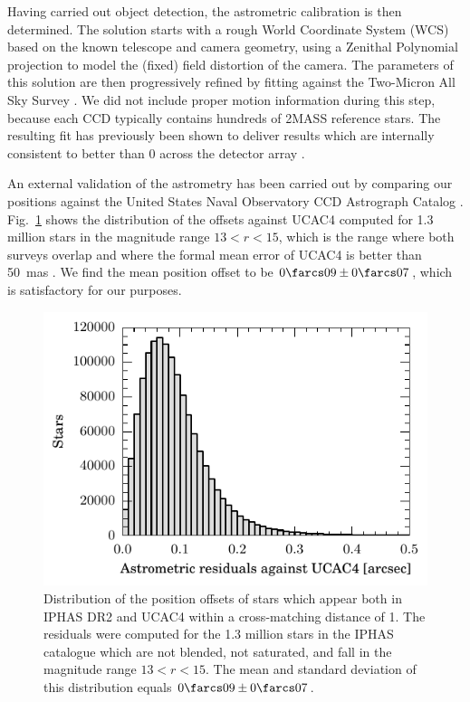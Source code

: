 \documentclass[a4paper,useAMS,usenatbib]{mn2e}
\begin{document}
{Having carried out object detection,
the astrometric calibration is then determined.
The solution starts with a rough 
World Coordinate System (WCS)
based on the known telescope and camera geometry,
using a Zenithal Polynomial projection
\citep[ZPN;][]{Calabretta2002}
to model the (fixed) field distortion of the camera.
The parameters of this solution
are then progressively refined by fitting against the
Two-Micron All Sky Survey \citep[2MASS; ][]{Skrutskie2006}.
We did not include proper motion information during this step,
because each CCD typically contains
hundreds of 2MASS reference stars.
The resulting fit has previously been shown
to deliver results which are internally consistent
to better than 0 across the detector array
\citep{Gonzalez-Solares2008}.

An external validation of the astrometry 
has been carried out by comparing our positions against the
United States Naval Observatory CCD Astrograph Catalog 
\citep[UCAC4;][]{UCAC4}.
Fig.~\ref{fig:astrometry} shows the distribution
of the offsets against UCAC4
computed for 1.3 million stars
in the magnitude range $13 < r < 15$,
which is the range where both surveys overlap
and where the formal mean error of UCAC4
is better than 50~mas \citep{UCAC3}.
We find the mean position offset to be $0\farcs 09\pm0\farcs 07$,
which is satisfactory for our purposes.

\begin{figure}
    \includegraphics[width=\linewidth]{figures/astrometry/astrometry.pdf} 
    \caption{Distribution of the position offsets
    		of stars
    		which appear both in IPHAS DR2 and UCAC4
    		within a cross-matching distance of 1\arcsec.
            The residuals were computed for 
            the 1.3 million stars in the IPHAS catalogue
            which are not blended, not saturated,
            and fall in the magnitude range $13 < r < 15$.
            The mean and standard deviation of this distribution 
            equals $0\farcs 09\pm0\farcs 07$.}
    \label{fig:astrometry}
\end{figure}

}
\end{document}
